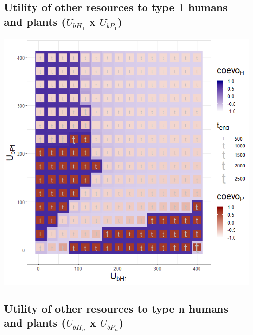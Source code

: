 \documentclass[
]{book}
\begin{document}
\newpage

\hypertarget{utility-of-other-resources-to-type-1-humans-and-plants-u_bh_1-x-u_bp_1}{%
\subsection{\texorpdfstring{Utility of other resources to type 1 humans and plants (\(U_{bH_{1}}\) x \(U_{bP_{1}}\))}{Utility of other resources to type 1 humans and plants (U\_\{bH\_\{1\}\} x U\_\{bP\_\{1\}\})}}\label{utility-of-other-resources-to-type-1-humans-and-plants-u_bh_1-x-u_bp_1}}


\includegraphics[width=1\linewidth]{plots/3_twoPar-U.bH1-U.bP1_plot}

\newpage

\hypertarget{utility-of-other-resources-to-type-n-humans-and-plants-u_bh_n-x-u_bp_n}{%
\subsection{\texorpdfstring{Utility of other resources to type n humans and plants (\(U_{bH_{n}}\) x \(U_{bP_{n}}\))}{Utility of other resources to type n humans and plants (U\_\{bH\_\{n\}\} x U\_\{bP\_\{n\}\})}}\label{utility-of-other-resources-to-type-n-humans-and-plants-u_bh_n-x-u_bp_n}}
\end{document}
